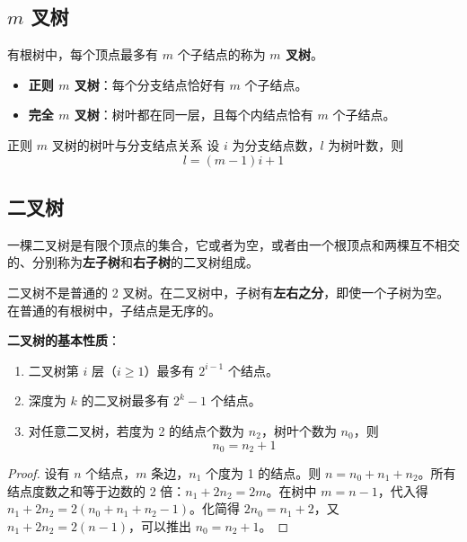 \subsection{$m$ 叉树}

\begin{mydefinition}{}
有根树中，每个顶点最多有 $m$ 个子结点的称为 \textbf{$m$ 叉树}。
\begin{itemize}
    \item \textbf{正则 $m$ 叉树}：每个分支结点恰好有 $m$ 个子结点。
    \item \textbf{完全 $m$ 叉树}：树叶都在同一层，且每个内结点恰有 $m$ 个子结点。
\end{itemize}
\end{mydefinition}

\begin{myTheorem}{正则 $m$ 叉树的树叶与分支结点关系}
设 $i$ 为分支结点数，$l$ 为树叶数，则
\[
l = (m-1)i + 1
\]
\end{myTheorem}

\subsection{二叉树}

\begin{mydefinition}{}
一棵二叉树是有限个顶点的集合，它或者为空，或者由一个根顶点和两棵互不相交的、分别称为\textbf{左子树}和\textbf{右子树}的二叉树组成。
\end{mydefinition}

\begin{remark}
二叉树不是普通的 2 叉树。在二叉树中，子树有\textbf{左右之分}，即使一个子树为空。在普通的有根树中，子结点是无序的。
\end{remark}

\textbf{二叉树的基本性质}：

\begin{enumerate}
    \item 二叉树第 $i$ 层（$i \geq 1$）最多有 $2^{i-1}$ 个结点。
    \item 深度为 $k$ 的二叉树最多有 $2^k-1$ 个结点。
    \item 对任意二叉树，若度为 2 的结点个数为 $n_2$，树叶个数为 $n_0$，则
    \[
    \boxed{n_0 = n_2 + 1}
    \]
\end{enumerate}

\begin{proof}
设有 $n$ 个结点，$m$ 条边，$n_1$ 个度为 1 的结点。则 $n = n_0 + n_1 + n_2$。所有结点度数之和等于边数的 2 倍：$n_1 + 2n_2 = 2m$。在树中 $m = n - 1$，代入得 $n_1 + 2n_2 = 2(n_0 + n_1 + n_2 - 1)$。化简得 $2n_0 = n_1 + 2$，又 $n_1 + 2n_2 = 2(n - 1)$，可以推出 $n_0 = n_2 + 1$。
\end{proof}

